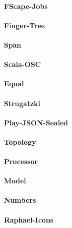 \documentclass[11pt,a4paper]{article}
\begin{document}
\paragraph{FScape-Jobs}

\paragraph{Finger-Tree}

\paragraph{Span}

\paragraph{Scala-OSC}

\paragraph{Equal}

\paragraph{Strugatzki}

\paragraph{Play-JSON-Sealed}

\paragraph{Topology}

\paragraph{Processor}

\paragraph{Model}

\paragraph{Numbers}

\paragraph{Raphael-Icons}
\end{document}
